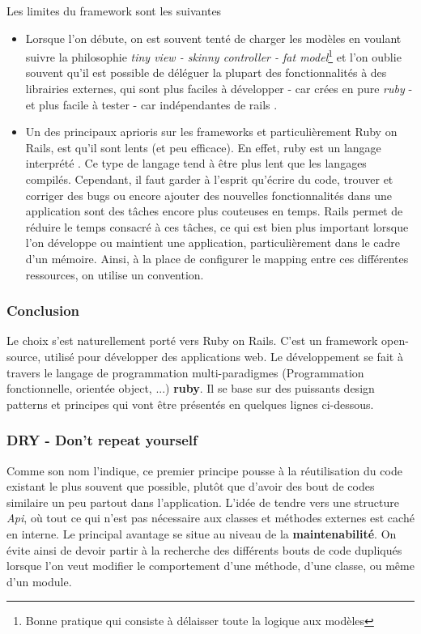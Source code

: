 Les limites du framework sont les suivantes
\begin{itemize}
\item Lorsque l'on débute, on est souvent tenté de charger les modèles en voulant suivre la philosophie \textit{tiny view - skinny controller - fat model}\footnote{Bonne pratique qui consiste à délaisser toute la logique aux modèles} et l'on oublie souvent qu'il est possible de déléguer la plupart des fonctionnalités à des librairies externes, qui sont plus faciles à développer - car crées en pure \textit{ruby} - et plus facile à tester - car indépendantes de rails \cite{fat_models}.

\item Un des principaux aprioris sur les frameworks et particulièrement Ruby on Rails, est qu'il sont lents (et peu efficace). En effet, ruby est un langage interprété . Ce type de langage tend à être plus lent que les langages compilés. Cependant, il faut garder à l'esprit qu'écrire du code, trouver et corriger des bugs ou encore ajouter des nouvelles fonctionnalités dans une application sont des tâches encore plus couteuses en temps. Rails permet de réduire le temps consacré à ces tâches, ce qui est bien plus important lorsque l'on développe ou maintient une application, particulièrement dans le cadre d'un mémoire. Ainsi, à la place de configurer le mapping entre ces différentes ressources, on utilise un convention.
\end{itemize}

\subsubsection{Conclusion}
Le choix s'est naturellement porté vers Ruby on Rails. C'est un framework open-source, utilisé pour développer des applications web. Le développement se fait à travers le langage de programmation multi-paradigmes (Programmation fonctionnelle, orientée object, ...) \textbf{ruby}. Il se base sur des puissants design patterns et principes qui vont être présentés en quelques lignes ci-dessous.

\subsubsection{DRY - Don't repeat yourself}
Comme son nom l'indique, ce premier principe pousse à la réutilisation du code existant le plus souvent que possible, plutôt que d'avoir des bout de codes similaire un peu partout dans l'application. L'idée de tendre vers une structure \textit{Api}, où tout ce qui n'est pas nécessaire aux classes et méthodes externes est caché en interne. Le principal avantage se situe au niveau de la \textbf{maintenabilité}. On évite ainsi de devoir partir à la recherche des différents bouts de code dupliqués lorsque l'on veut modifier le comportement d'une méthode, d'une classe, ou même d'un module.

